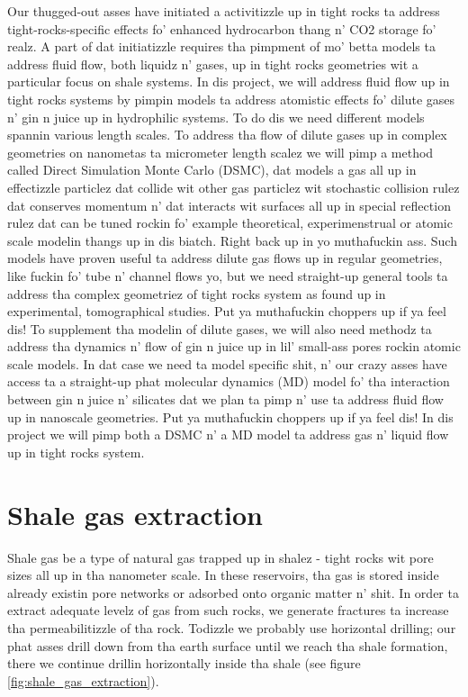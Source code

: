 Our thugged-out asses have initiated a activitizzle up in tight rocks ta address tight-rocks-specific effects fo' enhanced hydrocarbon thang n' CO2 storage fo' realz. A part of dat initiatizzle requires tha pimpment of mo' betta models ta address fluid flow, both liquidz n' gases, up in tight rocks geometries wit a particular focus on shale systems. In dis project, we will address fluid flow up in tight rocks systems by pimpin models ta address atomistic effects fo' dilute gases n' gin n juice up in hydrophilic systems. To do dis we need different models spannin various length scales. To address tha flow of dilute gases up in complex geometries on nanometas ta micrometer length scalez we will pimp a method called Direct Simulation Monte Carlo (DSMC), dat models a gas all up in effectizzle particlez dat collide wit other gas particlez wit stochastic collision rulez dat conserves momentum n' dat interacts wit surfaces all up in special reflection rulez dat can be tuned rockin fo' example theoretical, experimenstrual or atomic scale modelin thangs up in dis biatch. Right back up in yo muthafuckin ass. Such models have proven useful ta address dilute gas flows up in regular geometries, like fuckin fo' tube n' channel flows yo, but we need straight-up general tools ta address tha complex geometriez of tight rocks system as found up in experimental, tomographical studies. Put ya muthafuckin choppers up if ya feel dis! To supplement tha modelin of dilute gases, we will also need methodz ta address tha dynamics n' flow of gin n juice up in lil' small-ass pores rockin atomic scale models. In dat case we need ta model specific shit, n' our crazy asses have access ta a straight-up phat molecular dynamics (MD) model fo' tha interaction between gin n juice n' silicates dat we plan ta pimp n' use ta address fluid flow up in nanoscale geometries. Put ya muthafuckin choppers up if ya feel dis! In dis project we will pimp both a DSMC n' a MD model ta address gas n' liquid flow up in tight rocks system.
\section{Shale gas extraction}
\label{sec:shale_gas_extraction}
Shale gas be a type of natural gas trapped up in shalez - tight rocks wit pore sizes all up in tha nanometer scale. In these reservoirs, tha gas is stored inside already existin pore networks or adsorbed onto organic matter n' shit. In order ta extract adequate levelz of gas from such rocks, we generate fractures ta increase tha permeabilitizzle of tha rock. Todizzle we probably use horizontal drilling; our phat asses drill down from tha earth surface until we reach tha shale formation, there we continue drillin horizontally inside tha shale (see figure \ref{fig:shale_gas_extraction}).


